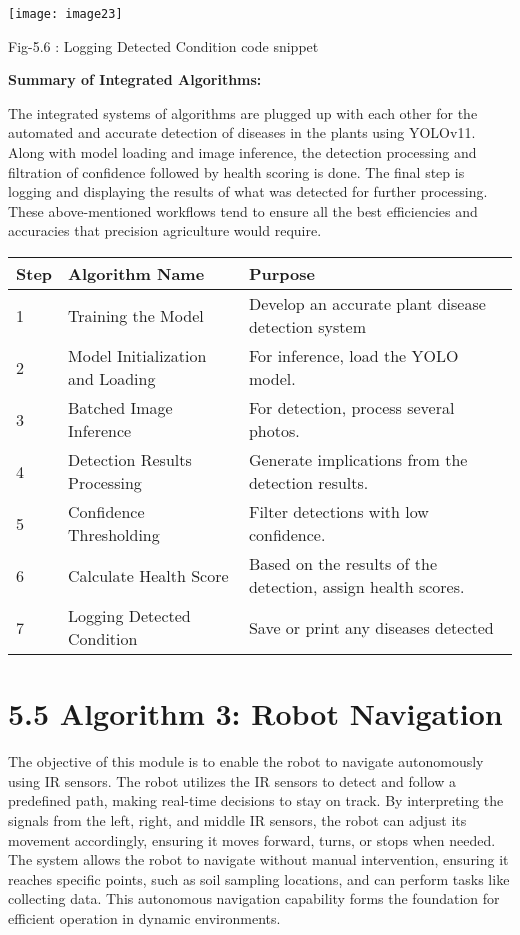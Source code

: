 \documentclass{book} %
\begin{document}
\noindent \textbf{}

\noindent 

\noindent \texttt{[image: image23]}\textbf{}

\noindent Fig-5.6 :  Logging Detected Condition code snippet\textbf{}

\noindent \textbf{Summary of Integrated Algorithms:}

\noindent The integrated systems of algorithms are plugged up with each other for the automated and accurate detection of diseases in the plants using YOLOv11. Along with model loading and image inference, the detection processing and filtration of confidence followed by health scoring is done. The final step is logging and displaying the results of what was detected for further processing. These above-mentioned workflows tend to ensure all the best efficiencies and accuracies that precision agriculture would require.\textbf{}

\begin{tabular}{|p{0.4in}|p{1.9in}|p{2.7in}|} \hline 
\textbf{Step} & \textbf{Algorithm Name} & \textbf{Purpose} \\ \hline 
1 & Training the Model & Develop an accurate plant disease detection system \\ \hline 
2 & Model Initialization and Loading & For inference, load the YOLO model. \\ \hline 
3 & Batched Image Inference & For detection, process several photos. \\ \hline 
4 & Detection Results Processing & Generate implications from the detection results. \\ \hline 
5 & Confidence Thresholding & Filter detections with low confidence. \\ \hline 
6 & Calculate Health Score & Based on the results of the detection, assign health scores. \\ \hline 
7 & Logging Detected Condition & Save or print any diseases detected \\ \hline 
\end{tabular}

\textbf{}

\noindent 
\section{5.5 Algorithm 3: Robot Navigation}

\noindent The objective of this module is to enable the robot to navigate autonomously using IR sensors. The robot utilizes the IR sensors to detect and follow a predefined path, making real-time decisions to stay on track. By interpreting the signals from the left, right, and middle IR sensors, the robot can adjust its movement accordingly, ensuring it moves forward, turns, or stops when needed. The system allows the robot to navigate without manual intervention, ensuring it reaches specific points, such as soil sampling locations, and can perform tasks like collecting data. This autonomous navigation capability forms the foundation for efficient operation in dynamic environments.
\end{document}
